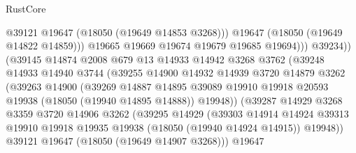 \begin{lexlean}{RustCore}
\begin{coremodule}
                                    @39121
                                    @19647
                                    (@18050 (@19649 @14853 @3268)))
                                  @19647
                                  (@18050 (@19649 @14822 @14859)))
                                @19665
                                @19669
                                @19674
                                @19679
                                @19685
                                @19694)))
                          @39234))
                      (@39145
                        @14874
                        @2008
                        @679
                        @13
                        @14933
                        @14942
                        @3268
                        @3762
                        (@39248
                          @14933
                          @14940
                          @3744
                          (@39255
                            @14900
                            @14932
                            @14939
                            @3720
                            @14879
                            @3262
                            (@39263
                              @14900
                              (@39269
                                @14887
                                @14895
                                @39089
                                @19910
                                @19918
                                @20593
                                @19938
                                (@18050 (@19940 @14895 @14888))
                                @19948))
                            (@39287
                              @14929
                              @3268
                              @3359
                              @3720
                              @14906
                              @3262
                              (@39295
                                @14929
                                (@39303
                                  @14914
                                  @14924
                                  @39313
                                  @19910
                                  @19918
                                  @19935
                                  @19938
                                  (@18050 (@19940 @14924 @14915))
                                  @19948))
                              @39121
                              @19647
                              (@18050 (@19649 @14907 @3268)))
                            @19647

\end{coremodule}
\end{lexlean}
